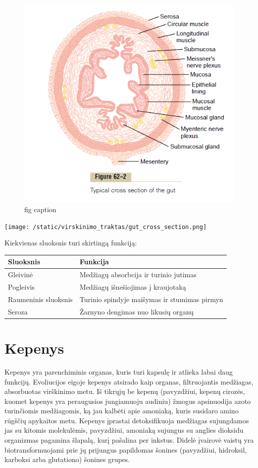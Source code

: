 \documentclass[]{book}
\begin{document}
\begin{figure}
\includegraphics[width=7.42in]{static/virskinimo_traktas/gut_cross_section} \caption{fig caption}\label{fig:my-fig}
\end{figure}

\texttt{[image: /static/virskinimo\_traktas/gut\_cross\_section.png]}

Kiekvienas sluoksnis turi skirtingą funkciją:

\begin{tabular}{l|l}
\hline
Sluoksnis & Funkcija\\
\hline
Gleivinė & Medžiagų absorbcija ir turinio jutimas\\
\hline
Pogleivis & Medžiagų išnešiojimas į kraujotaką\\
\hline
Raumeninis sluoksnis & Turinio spindyje maišymas ir stumimas pirmyn\\
\hline
Seroza & Žarnyno dengimas nuo likusių organų\\
\hline
\end{tabular}

\hypertarget{kepenys}{%
\section{Kepenys}\label{kepenys}}

Kepenys yra parenchiminis organas, kuris turi kapsulę ir atlieka labai daug funkcijų. Evoliucijos eigoje kepenys atsirado kaip organas, filtruojantis medžiagas, absorbuotas virškinimo metu. Iš tikrųjų be kepenų (pavyzdžiui, kepenų cirozės, kuomet kepenys yra peraugusios jungiamuoju audiniu) žmogus apsinuodija azoto turinčiomis medžiagomis, ką jau kalbėti apie amoniaką, kuris susidaro amino rūgščių apykaitos metu. Kepenys įprastai detoksifikuoja medžiagas sujungdamos jas su kitomis molekulėmis, pavyzdžiui, amoniaką sujungus su anglies dioksidu organizmas pagamina šlapalą, kurį pašalina per inkstus. Didelė įvairovė vaistų yra biotransformuojami prie jų prijungus papildomas šonines (pavyzdžiui, hidroksil, karboksi arba glutationo) šonines grupes.
\end{document}
